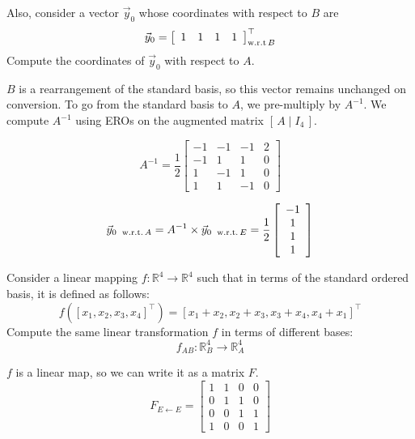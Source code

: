 \documentclass[a4paper,11pt]{exam}
\begin{document}
\begin{questions}
\begin{parts}
\begin{subparts}
\begin{solution}
            \end{solution}

            \subpart Also, consider a vector $\vec{y}_0$ whose coordinates with respect to $B$ are
            $$
                \vec{y}_0=\left[\begin{array}{llll}
                        1 & 1 & 1 & 1
                    \end{array}\right]_{\text {w.r.t\,} B}^{\top}
            $$
            Compute the coordinates of $\vec{y}_0$ with respect to $A$.

            \begin{solution}
                $B$ is a rearrangement of the standard basis, so this vector remains unchanged on conversion.
                To go from the standard basis to $A$, we pre-multiply by $A^{-1}$.
                We compute $A^{-1}$ using EROs on the augmented matrix $[\, A \mid I_4 \,]$.

                \[
                    A^{-1} = \frac{1}{2} \left[ \begin{array}{cccc}
                            -1 & -1 & -1 & 2 \\-1 & 1 & 1 & 0\\1 & -1 & 1 & 0\\1 & 1 & -1 & 0
                        \end{array}\right]
                \]

                \[
                    \vec{y}_{0 \; \text{ w.r.t.\,} A} = A^{-1} \times \vec{y}_{0 \; \text{ w.r.t.\,} E} = \frac{1}{2} \left[ \begin{array}{c} -1 \\ 1 \\ 1 \\ 1 \end{array} \right]
                \]

            \end{solution}

            \subpart Consider a linear mapping $f: \mathbb{R}^4 \rightarrow \mathbb{R}^4$ such that in terms of the standard ordered basis, it is defined as follows:
            $$
                f\left(\left[x_1, x_2, x_3, x_4\right]^{\top}\right)=\left[x_1+x_2, x_2+x_3, x_3+x_4, x_4+x_1\right]^{\top}
            $$
            Compute the same linear transformation $f$ in terms of different bases:
            $$
                f_{A B}: \mathbb{R}_B^4 \rightarrow \mathbb{R}_A^4
            $$

            \begin{solution}
                $f$ is a linear map, so we can write it as a matrix $F$.
                \[
                    F_{E \leftarrow E} = \left[
                        \begin{array}{cccc}
                            1 & 1 & 0 & 0 \\0 & 1 & 1 & 0\\0 & 0 & 1 & 1\\1 & 0 & 0 & 1
                        \end{array}
                        \right]
                \]


\end{solution}
\end{subparts}
\end{parts}
\end{questions}
\end{document}
